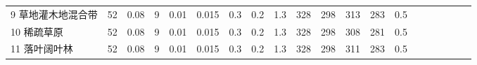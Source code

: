 \begin{sidewaystable}[]
\begin{tabular}{@{}lccccccccccccccccccc@{}}
    9 草地灌木地混合带     & 52                                                                & 0.08                                                                                                   & 9                                                                                  & 0.01                                                                               & 0.015                                                               & 0.3                                                       & 0.2                                                       & 1.3                                                       & 328                                                             & 298                                                             & 313                                                              & 283                                                               & 0.5                                                          \\
    10 稀疏草原        & 52                                                                & 0.08                                                                                                   & 9                                                                                  & 0.01                                                                               & 0.015                                                               & 0.3                                                       & 0.2                                                       & 1.3                                                       & 328                                                             & 298                                                             & 308                                                              & 281                                                               & 0.5                                                          \\
    11 落叶阔叶林       & 52                                                                & 0.08                                                                                                   & 9                                                                                  & 0.01                                                                               & 0.015                                                               & 0.3                                                       & 0.2                                                       & 1.3                                                       & 328                                                             & 298                                                             & 311                                                              & 283                                                               & 0.5                                                          \\

\end{tabular}
\end{sidewaystable}
